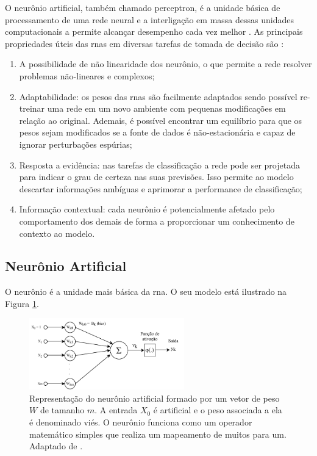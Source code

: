 O neurônio artificial, também chamado perceptron, é a unidade básica de processamento de uma rede neural e a interligação em massa dessas unidades computacionais a permite alcançar desempenho cada vez melhor \cite{Haykin}.  As principais propriedades úteis das \acrshort{rna}s em diversas tarefas de tomada de decisão são \cite{Haykin}:
\begin{enumerate}
	\item A possibilidade de não linearidade dos neurônio, o que permite a rede resolver problemas não-lineares e complexos;
	\item  Adaptabilidade: os pesos das \acrshort{rna}s são facilmente adaptados sendo possível re-treinar uma rede em um novo ambiente com pequenas modificações em relação ao original. Ademais, é possível encontrar um equilíbrio para que os pesos sejam modificados se a fonte de dados é não-estacionária e capaz de ignorar perturbações espúrias;
	\item Resposta a evidência: nas tarefas de classificação a rede pode ser projetada para indicar o grau de certeza nas suas previsões. Isso permite ao modelo descartar informações ambíguas e aprimorar a performance de classificação;
	\item Informação contextual: cada neurônio é potencialmente afetado pelo comportamento dos demais de forma a proporcionar um conhecimento de contexto ao modelo.
\end{enumerate}



\subsection{Neurônio Artificial}
O neurônio é a unidade mais básica da \acrshort{rna}. O seu modelo está ilustrado na Figura \ref{fig:neuronio}.

\begin{figure}[h]
	\centering
	\includegraphics[width=0.6\textwidth]{figuras/neuronio.pdf}
	\caption[Modelo do neurônio matemático.]{Representação do neurônio artificial formado por um vetor de peso $W$ de tamanho $m$. A entrada $X_0$ é artificial e o peso associada a ela é denominado viés. O neurônio funciona como um operador matemático simples que realiza um mapeamento de muitos para um. Adaptado de \cite{Haykin}.}
	\label{fig:neuronio}
\end{figure}

